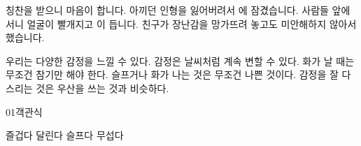 \documentclass[fs13,seriesSau]{korfarm-base}
\begin{document}


\kfActivityBg \par{}\par\nopagebreak[4]\smallskip\nopagebreak[4]
\begin{kfBlankList}
\kfBlankItem 칭찬을 받으니 마음이 \kfFillBlank[12mm]{}합니다.
\kfBlankItem 아끼던 인형을 잃어버려서 \kfFillBlank[12mm]{}에 잠겼습니다.
\kfBlankItem 사람들 앞에 서니 얼굴이 빨개지고 \kfFillBlank[12mm]{}이 듭니다.
\kfBlankItem 친구가 장난감을 망가뜨려 놓고도 미안해하지 않아서 \kfFillBlank[12mm]{}했습니다.
\end{kfBlankList}

\kfActivityBg \par{}\par\nopagebreak[4]\smallskip\nopagebreak[4]
\begin{kfOXList}
\kfOXItem 우리는 다양한 감정을 느낄 수 있다. \kfFillBlank[12mm]{} \kfOX
\kfOXItem 감정은 날씨처럼 계속 변할 수 있다. \kfFillBlank[12mm]{} \kfOX
\kfOXItem 화가 날 때는 무조건 참기만 해야 한다. \kfFillBlank[12mm]{} \kfOX
\kfOXItem 슬프거나 화가 나는 것은 무조건 나쁜 것이다. \kfFillBlank[12mm]{} \kfOX
\kfOXItem 감정을 잘 다스리는 것은 우산을 쓰는 것과 비슷하다. \kfFillBlank[12mm]{} \kfOX
\end{kfOXList}

\kfActivityBg \par{}\par\nopagebreak[4]\smallskip\nopagebreak[4]
\begin{kfConnect}
\end{kfConnect}


\begin{kfQBlock}{01}{객관식}
\begin{kfChoices}
\kfChoice 즐겁다
\kfChoice 달린다
\kfChoice 슬프다
\kfChoice 무섭다
\end{kfChoices}
\end{kfQBlock}
\end{document}
